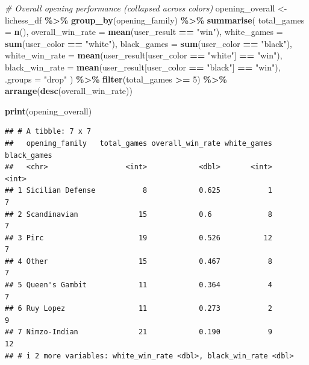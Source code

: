 \documentclass[
]{article}
\newenvironment{Shaded}{\begin{snugshade}}{\end{snugshade}}
\newcommand{\AttributeTok}[1]{\textcolor[rgb]{0.13,0.29,0.53}{#1}}
\newcommand{\CommentTok}[1]{\textcolor[rgb]{0.56,0.35,0.01}{\textit{#1}}}
\newcommand{\DecValTok}[1]{\textcolor[rgb]{0.00,0.00,0.81}{#1}}
\newcommand{\FunctionTok}[1]{\textcolor[rgb]{0.13,0.29,0.53}{\textbf{#1}}}
\newcommand{\NormalTok}[1]{#1}
\newcommand{\OtherTok}[1]{\textcolor[rgb]{0.56,0.35,0.01}{#1}}
\newcommand{\SpecialCharTok}[1]{\textcolor[rgb]{0.81,0.36,0.00}{\textbf{#1}}}
\newcommand{\StringTok}[1]{\textcolor[rgb]{0.31,0.60,0.02}{#1}}
\begin{document}
\begin{Shaded}
\begin{Highlighting}[]
\CommentTok{\# Overall opening performance (collapsed across colors)}
\NormalTok{opening\_overall }\OtherTok{\textless{}{-}}\NormalTok{ lichess\_df }\SpecialCharTok{\%\textgreater{}\%}
  \FunctionTok{group\_by}\NormalTok{(opening\_family) }\SpecialCharTok{\%\textgreater{}\%}
  \FunctionTok{summarise}\NormalTok{(}
    \AttributeTok{total\_games =} \FunctionTok{n}\NormalTok{(),}
    \AttributeTok{overall\_win\_rate =} \FunctionTok{mean}\NormalTok{(user\_result }\SpecialCharTok{==} \StringTok{"win"}\NormalTok{),}
    \AttributeTok{white\_games =} \FunctionTok{sum}\NormalTok{(user\_color }\SpecialCharTok{==} \StringTok{"white"}\NormalTok{),}
    \AttributeTok{black\_games =} \FunctionTok{sum}\NormalTok{(user\_color }\SpecialCharTok{==} \StringTok{"black"}\NormalTok{),}
    \AttributeTok{white\_win\_rate =} \FunctionTok{mean}\NormalTok{(user\_result[user\_color }\SpecialCharTok{==} \StringTok{"white"}\NormalTok{] }\SpecialCharTok{==} \StringTok{"win"}\NormalTok{),}
    \AttributeTok{black\_win\_rate =} \FunctionTok{mean}\NormalTok{(user\_result[user\_color }\SpecialCharTok{==} \StringTok{"black"}\NormalTok{] }\SpecialCharTok{==} \StringTok{"win"}\NormalTok{),}
    \AttributeTok{.groups =} \StringTok{"drop"}
\NormalTok{  ) }\SpecialCharTok{\%\textgreater{}\%}
  \FunctionTok{filter}\NormalTok{(total\_games }\SpecialCharTok{\textgreater{}=} \DecValTok{5}\NormalTok{) }\SpecialCharTok{\%\textgreater{}\%}
  \FunctionTok{arrange}\NormalTok{(}\FunctionTok{desc}\NormalTok{(overall\_win\_rate))}

\FunctionTok{print}\NormalTok{(opening\_overall)}
\end{Highlighting}
\end{Shaded}

\begin{verbatim}
## # A tibble: 7 x 7
##   opening_family   total_games overall_win_rate white_games black_games
##   <chr>                  <int>            <dbl>       <int>       <int>
## 1 Sicilian Defense           8            0.625           1           7
## 2 Scandinavian              15            0.6             8           7
## 3 Pirc                      19            0.526          12           7
## 4 Other                     15            0.467           8           7
## 5 Queen's Gambit            11            0.364           4           7
## 6 Ruy Lopez                 11            0.273           2           9
## 7 Nimzo-Indian              21            0.190           9          12
## # i 2 more variables: white_win_rate <dbl>, black_win_rate <dbl>
\end{verbatim}
\end{document}
